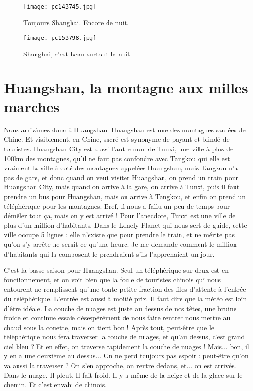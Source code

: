 \documentclass{book}
\begin{document}
\begin{figure}[h]
\centering
\texttt{[image: pc143745.jpg]}
\caption*{Toujours Shanghai. Encore de nuit.}
\end{figure}


\begin{figure}[h]
\centering
\texttt{[image: pc153798.jpg]}
\caption*{Shanghai, c'est beau surtout la nuit.}
\end{figure}



\chapter{Huangshan, la montagne aux milles marches}
Nous arrivâmes donc à Huangshan. Huangshan est une des montagnes sacrées de Chine. Et visiblement, en Chine, sacré est synonyme de payant et blindé de touristes. Huangshan City est aussi l'autre nom de Tunxi, une ville à plus de 100km des montagnes, qu'il ne faut pas confondre avec Tangkou qui elle est vraiment la ville à coté des montagnes appelées Huangshan, mais Tangkou n'a pas de gare, et donc quand on veut visiter Huangshan, on prend un train pour Huangshan City, mais quand on arrive à la gare, on arrive à Tunxi, puis il faut prendre un bus pour Huangshan, mais on arrive à Tangkou, et enfin on prend un téléphérique pour les montagnes. Bref, il nous a fallu un peu de temps pour démêler tout ça, mais on y est arrivé ! Pour l’anecdote, Tunxi est une ville de plus d'un million d'habitants. Dans le Lonely Planet qui nous sert de guide, cette ville occupe 5 lignes  : elle n'existe que pour prendre le train, et ne mérite pas qu'on s'y arrête ne serait-ce qu'une heure. Je me demande comment le million d'habitants qui la composent le prendraient s'ils l’apprenaient un jour.

C'est la basse saison pour Huangshan. Seul un téléphérique sur deux est en fonctionnement, et on voit bien que la foule de touristes chinois qui nous entourent ne remplissent qu'une toute petite fraction des files d'attente à l'entrée du téléphérique. L'entrée est aussi à moitié prix. Il faut dire que la météo est loin d'être idéale. La couche de nuages est juste au dessus de nos têtes, une bruine froide et continue essaie désespérément de nous faire rentrer nous mettre au chaud sous la couette, mais on tient bon ! Après tout, peut-être que le téléphérique nous fera traverser la couche de nuages, et qu'au dessus, c'est grand ciel bleu ? Et en effet, on traverse rapidement la couche de nuages ! Mais... bon, il y en a une deuxième au dessus... On ne perd toujours pas espoir : peut-être qu'on va aussi la traverser ? On s'en approche, on rentre dedans, et... on est arrivés. Dans le nuage. Il pleut. Il fait froid. Il y a même de la neige et de la glace sur le chemin. Et c'est envahi de chinois.
\end{document}
